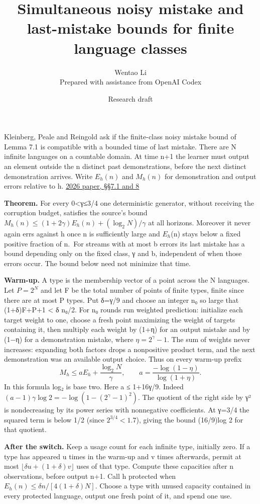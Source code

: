 \documentclass[11pt]{article}
\title{Simultaneous noisy mistake and last-mistake bounds for finite language classes}
\author{Wentao Li\\{\small Prepared with assistance from OpenAI Codex}}
\date{Research draft}
\begin{document}
\maketitle
Kleinberg, Peale and Reingold ask if the finite-class noisy mistake bound of Lemma 7.1 is compatible with a bounded time of last mistake. There are N infinite languages on a countable domain. At time n+1 the learner must output an element outside the n distinct past demonstrations, before the next distinct demonstration arrives. Write \(E_h(n)\) and \(M_h(n)\) for demonstration and output errors relative to h. \href{https://arxiv.org/abs/2605.10809}{2026 paper, §§7.1 and 8}

\textbf{Theorem.} For every 0\textless γ≤3/4 one deterministic generator, without receiving the corruption budget, satisfies the source's bound \(M_h(n)\le(1+2\gamma)E_h(n)+(\log_2 N)/\gamma\) at all horizons. Moreover it never again errs against h once n is sufficiently large and \(E_{h}\)(n) stays below a fixed positive fraction of n.~For streams with at most b errors its last mistake has a bound depending only on the fixed class, γ and b, independent of when those errors occur. The bound below need not minimize that time.

\textbf{Warm-up.} A type is the membership vector of a point across the N languages. Let \(P=2^N\) and let F be the total number of points of finite types, finite since there are at most P types. Put δ=γ/9 and choose an integer n₀ so large that (1+δ)F+P+1 \textless{} δ n₀/2. For n₀ rounds run weighted prediction: initialize each target weight to one, choose a fresh point maximizing the weight of targets containing it, then multiply each weight by (1+η) for an output mistake and by (1−η) for a demonstration mistake, where \(\eta=2^\gamma-1\). The sum of weights never increases: expanding both factors drops a nonpositive product term, and the next demonstration was an available output choice. Thus on every warm-up prefix
\[M_h\le aE_h+\frac{\log_2 N}{\gamma},\qquad a=\frac{-\log(1-\eta)}{\log(1+\eta)}.\]
In this formula log₂ is base two. Here a ≤ 1+16γ/9. Indeed \((a-1)\gamma\log 2=-\log(1-(2^\gamma-1)^2)\). The quotient of the right side by γ² is nondecreasing by its power series with nonnegative coefficients. At γ=3/4 the squared term is below 1/2 (since \(2^{3/4}<1.7\)), giving the bound (16/9)log 2 for that quotient.

\textbf{After the switch.} Keep a usage count for each infinite type, initially zero. If a type has appeared u times in the warm-up and v times afterwards, permit at most \(\lfloor\delta u+(1+\delta)v\rfloor\) uses of that type. Compute these capacities after n observations, before output n+1. Call h protected when \(E_h(n)\le \delta n/[4(1+\delta)N]\). Choose a type with unused capacity contained in every protected language, output one fresh point of it, and spend one use.
\end{document}

